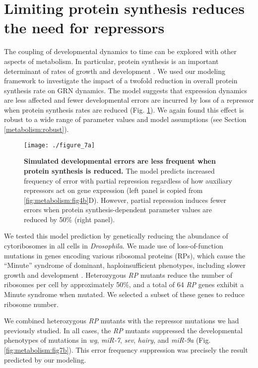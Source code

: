 \section{Limiting protein synthesis reduces the need for repressors}

The coupling of developmental dynamics to time can be explored with other aspects of metabolism. In particular, protein synthesis is an important determinant of rates of growth and development \cite{Lempiainen2009}. We used our modeling framework to investigate the impact of a twofold reduction in overall protein synthesis rate on GRN dynamics. The model suggests that expression dynamics are less affected and fewer developmental errors are incurred by loss of a repressor when protein synthesis rates are reduced (Fig. \ref{fig:metabolism:fig7a}). We again found this effect is robust to a wide range of parameter values and model assumptions (see Section \ref{metabolism:robust}).

\begin{figure}[h!]
\centering
\texttt{[image: ./figure\_7a]}
\caption[Simulated errors are less frequent when protein synthesis is reduced.]{\textbf{Simulated developmental errors are less frequent when protein synthesis is reduced.} The model predicts increased frequency of error with partial repression regardless of how auxiliary repressors act on gene expression (left panel is copied from \ref{fig:metabolism:fig4b}D). However, partial repression induces fewer errors when protein synthesis-dependent parameter values are reduced by 50\% (right panel).}
\label{fig:metabolism:fig7a}
\end{figure}

We tested this model prediction by genetically reducing the abundance of cytoribosomes in all cells in \textit{Drosophila}. We made use of loss-of-function mutations in genes encoding various ribosomal proteins (RPs), which cause the ``Minute'' syndrome of dominant, haploinsufficient phenotypes, including slower growth and development \cite{Marygold2007,Sæbøelarssen1998}. Heterozygous \textit{RP} mutants reduce the number of ribosomes per cell by approximately 50\%, and a total of 64 \textit{RP} genes exhibit a Minute syndrome when mutated. We selected a subset of these genes to reduce ribosome number.

We combined heterozygous \textit{RP} mutants with the repressor mutations we had previously studied. In all cases, the \textit{RP} mutants suppressed the developmental phenotypes of mutations in \textit{wg}, \textit{miR-7}, \textit{sev}, \textit{hairy}, and \textit{miR-9a} (Fig. \ref{fig:metabolism:fig7b}). This error frequency suppression was precisely the result predicted by our modeling.

